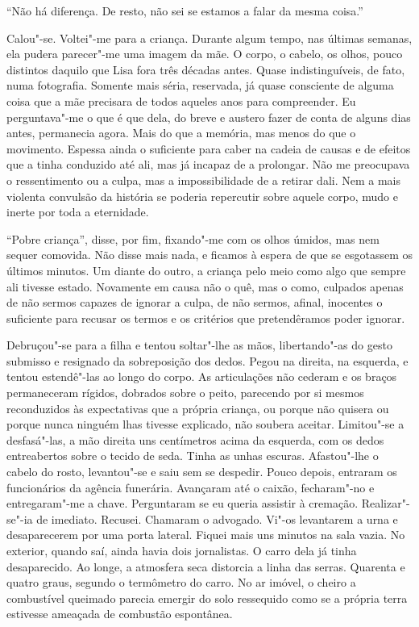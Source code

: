 ``Não há diferença. De resto, não sei se estamos a falar da mesma coisa.''

Calou"-se. Voltei"-me para a criança. Durante algum tempo, nas últimas
semanas, ela pudera parecer"-me uma imagem da mãe. O corpo, o cabelo, os
olhos, pouco distintos daquilo que Lisa fora três décadas antes. Quase
indistinguíveis, de fato, numa fotografia. Somente mais séria,
reservada, já quase consciente de alguma coisa que a mãe precisara de
todos aqueles anos para compreender. Eu perguntava"-me o que é que dela,
do breve e austero fazer de conta de alguns dias antes, permanecia
agora. Mais do que a memória, mas menos do que o movimento. Espessa
ainda o suficiente para caber na cadeia de causas e de efeitos que a
tinha conduzido até ali, mas já incapaz de a prolongar. Não me
preocupava o ressentimento ou a culpa, mas a impossibilidade de a
retirar dali. Nem a mais violenta convulsão da história se poderia
repercutir sobre aquele corpo, mudo e inerte por toda a eternidade.

``Pobre criança'',
disse, por fim, fixando"-me com os olhos úmidos, mas nem sequer
comovida. Não disse mais nada, e ficamos à espera de que se esgotassem
os últimos minutos. Um diante do outro, a criança pelo meio como algo
que sempre ali tivesse estado. Novamente em causa não o quê, mas o como,
culpados apenas de não sermos capazes de ignorar a culpa, de não sermos,
afinal, inocentes o suficiente para recusar os termos e os critérios que
pretendêramos poder ignorar.

Debruçou"-se para a filha e tentou soltar"-lhe as mãos, libertando"-as
do gesto submisso e resignado da sobreposição dos dedos. Pegou na
direita, na esquerda, e tentou estendê"-las ao longo do corpo. As
articulações não cederam e os braços permaneceram rígidos, dobrados
sobre o peito, parecendo por si mesmos reconduzidos às expectativas que
a própria criança, ou porque não quisera ou porque nunca ninguém lhas
tivesse explicado, não soubera aceitar. Limitou"-se a desfasá"-las, a
mão direita uns centímetros acima da esquerda, com os dedos entreabertos
sobre o tecido de seda. Tinha as unhas escuras. Afastou"-lhe o cabelo do
rosto, levantou"-se e saiu sem se despedir. Pouco depois, entraram os
funcionários da agência funerária. Avançaram até o caixão, fecharam"-no
e entregaram"-me a chave. Perguntaram se eu queria assistir à cremação.
Realizar"-se"-ia de imediato. Recusei. Chamaram o advogado. Vi"-os
levantarem a urna e desaparecerem por uma porta lateral. Fiquei mais uns
minutos na sala vazia. No exterior, quando saí, ainda havia dois
jornalistas. O carro dela já tinha desaparecido. Ao longe, a atmosfera
seca distorcia a linha das serras. Quarenta e quatro graus, segundo o
termômetro do carro. No ar imóvel, o cheiro a combustível queimado
parecia emergir do solo ressequido como se a própria terra estivesse
ameaçada de combustão espontânea.

